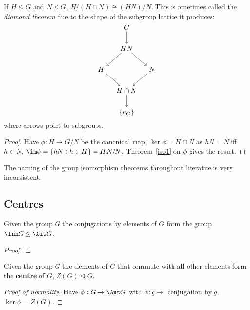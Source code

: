 \documentclass[../Year2.tex]{subfiles}
\begin{document}
\begin{theorem}\label{iso2}
    If $H\leq G$ and $N\unlhd G$, $H/(H\cap N)\cong (HN)/N$. This is ometimes called the \textit{diamond theorem} due to the shape of the subgroup lattice it produces: \[
        \begin{tikzcd}[cramped, column sep=small]
            & G \arrow[d]& \\
            & HN \arrow[ld] \arrow [rd]& \\
            H \arrow[rd] & & N \arrow[ld]\\
            & H\cap N \arrow[d]& \\
            & \{e_G\}& 
        \end{tikzcd}
    \] where arrows point to subgroups.
    \begin{proof}
        Have $\phi:H\rightarrow G/N$ be the canonical map, $\ker\phi = H\cap N$ as $hN=N$ iff $h\in N$, $\im \phi = \{hN:h\in H\}=HN/N$, Theorem~\ref{iso1} on $\phi$ gives the result.
    \end{proof}
\end{theorem}

\begin{note}
    The naming of the group isomorphism theorems throughout literatue is very inconsistent.
\end{note}

\subsection{Centres}

\begin{definition}
    Given the group $G$ the conjugations by elements of $G$ form the group $\Inn G\unlhd\Aut G$.
    \begin{proof}
        
    \end{proof}
\end{definition}

\begin{definition}
    Given the group $G$ the elements of $G$ that commute with all other elements form the \textbf{centre} of $G$, $Z(G)\unlhd G$.
    \begin{proof}[Proof of normality]
        Have $\phi:G\rightarrow\Aut G$ with $\phi:g\mapsto$ conjugation by $g$, $\ker \phi = Z(G)$.
    \end{proof}
\end{definition}
\end{document}
